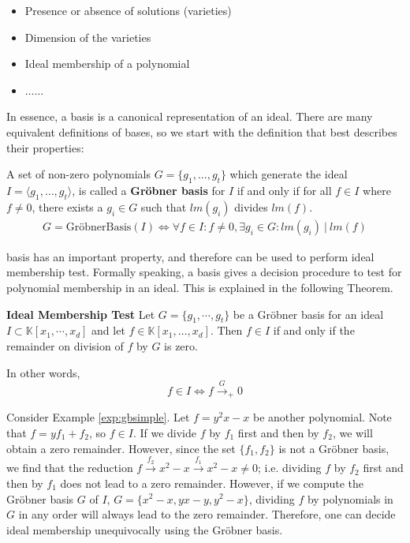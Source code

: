\begin{itemize}
\item Presence or absence of solutions (varieties)
\item Dimension of the varieties
\item Ideal membership of a polynomial
\item $\dots \dots$
\end{itemize} 

In essence, a \Grobner basis is a canonical representation of an ideal.
There are many equivalent definitions of \Grobner bases, so we start with 
the definition that best describes their properties:

\begin{Definition}
A set of non-zero polynomials $G=\{g_1,\dots,g_t\}$ which generate the 
ideal $I=\langle g_1,\dots,g_t\rangle$, is called a 
{\bf Gr\"obner basis} for $I$ if and only if 
for all $f \in I$ where $f \neq 0$, there exists a $g_i \in G$ such that $lm(g_i)$ divides $lm(f)$.
\begin{eqnarray}
G = \text{Gr\"obner{Basis}} (I) \iff 
\forall f \in I: f \neq 0, \exists g_i \in G: lm(g_i)\ |\ lm(f)
        \label{eqn:groebnermin}
    \end{eqnarray}
    
\end{Definition}

\Grobner basis has an important property, and therefore can be used to perform ideal membership test.
Formally speaking, a \Grobner basis gives a decision procedure to test 
for polynomial membership in an ideal. This is explained in the following 
Theorem.
    
\begin{Theorem}\label{the:membership}
	{\bf Ideal Membership Test}
 Let $G = \{g_1,\cdots,g_t \}$ be a Gr\"obner basis for an ideal $I \subset \mathbb{K}[x_1,\cdots,x_d ]$
	and let $f \in \mathbb{K}[x_{1},\dots, x_{d}]$. Then $f \in I$ if and only if the remainder on division of $f$ by
	$G$ is zero.
\end{Theorem}
In other words, 
\begin{equation}
f \in I \iff f \stackrel{G}{\textstyle\longrightarrow}_+0
\end{equation}

\begin{Example}
Consider Example \ref{exp:gbsimple}. Let $f = y^2x - x$ be another
polynomial. Note that $f = yf_1 + f_2$, so $f \in I$. If we divide $f$
by $f_1$ first and then by $f_2$, we will obtain a zero
remainder. However, since the set $\{f_1, f_2\}$ is not a Gr\"{o}bner
basis, we find that the reduction $f
\stackrel{f_2}{\textstyle\longrightarrow} x^2 - x
\stackrel{f_1}{\textstyle\longrightarrow} x^2 - x  \neq 0$;
i.e. dividing $f$ by $f_2$ first and then by $f_1$ does not lead to a
zero remainder. However,  if we compute the Gr\"{o}bner basis $G$ of
$I$, $G = \{x^2 - x, yx - y, y^2 - x\}$, dividing $f$ by polynomials
in $G$ in any order will always lead to the zero remainder. Therefore,
one can decide ideal membership unequivocally using the Gr\"{o}bner
basis. 
\end{Example}


